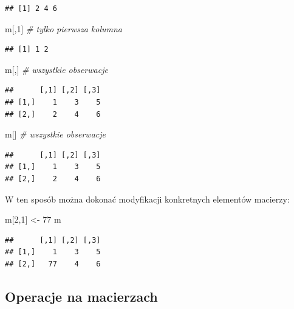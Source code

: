 \documentclass[]{book}
\newenvironment{Shaded}{\begin{snugshade}}{\end{snugshade}}
\newcommand{\DecValTok}[1]{\textcolor[rgb]{0.00,0.00,0.81}{#1}}
\newcommand{\StringTok}[1]{\textcolor[rgb]{0.31,0.60,0.02}{#1}}
\newcommand{\CommentTok}[1]{\textcolor[rgb]{0.56,0.35,0.01}{\textit{#1}}}
\newcommand{\NormalTok}[1]{#1}
\begin{document}
\begin{verbatim}
## [1] 2 4 6
\end{verbatim}

\begin{Shaded}
\begin{Highlighting}[]
\NormalTok{m[,}\DecValTok{1}\NormalTok{]  }\CommentTok{# tylko pierwsza kolumna}
\end{Highlighting}
\end{Shaded}

\begin{verbatim}
## [1] 1 2
\end{verbatim}

\begin{Shaded}
\begin{Highlighting}[]
\NormalTok{m[,]   }\CommentTok{# wszystkie obserwacje}
\end{Highlighting}
\end{Shaded}

\begin{verbatim}
##      [,1] [,2] [,3]
## [1,]    1    3    5
## [2,]    2    4    6
\end{verbatim}

\begin{Shaded}
\begin{Highlighting}[]
\NormalTok{m[]    }\CommentTok{# wszystkie obserwacje}
\end{Highlighting}
\end{Shaded}

\begin{verbatim}
##      [,1] [,2] [,3]
## [1,]    1    3    5
## [2,]    2    4    6
\end{verbatim}

W ten sposób można dokonać modyfikacji konkretnych elementów macierzy:

\begin{Shaded}
\begin{Highlighting}[]
\NormalTok{m[}\DecValTok{2}\NormalTok{,}\DecValTok{1}\NormalTok{] <-}\StringTok{ }\DecValTok{77}
\NormalTok{m}
\end{Highlighting}
\end{Shaded}

\begin{verbatim}
##      [,1] [,2] [,3]
## [1,]    1    3    5
## [2,]   77    4    6
\end{verbatim}

\subsection{Operacje na macierzach}\label{operacje-na-macierzach}
\end{document}
